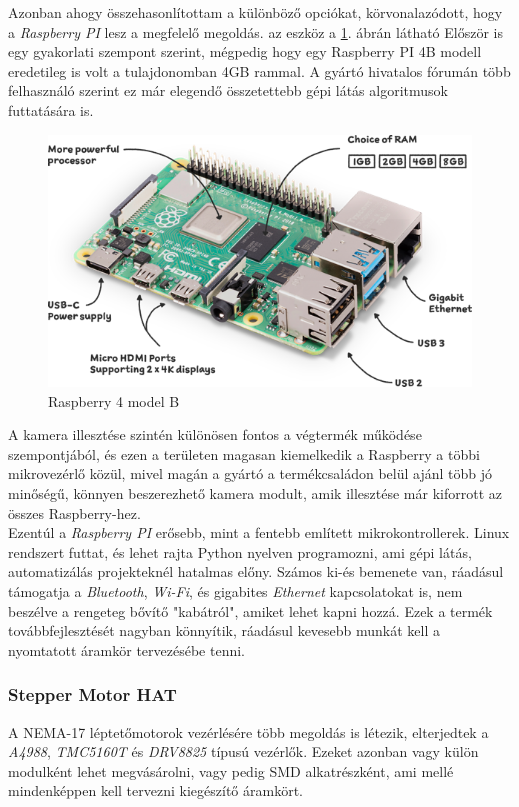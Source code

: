 \documentclass[12pt,a4paper]{article}
\begin{document}
Azonban ahogy összehasonlítottam a különböző opciókat, körvonalazódott, hogy a \textsl{Raspberry PI} lesz a megfelelő megoldás. az eszköz a \ref{fig:elek_raspberry4b}. ábrán látható Először is egy gyakorlati szempont szerint, mégpedig hogy egy Raspberry PI 4B modell eredetileg is volt a tulajdonomban 4GB rammal. A gyártó hivatalos fórumán több felhasználó szerint ez már elegendő összetettebb gépi látás algoritmusok futtatására is. \cite{4gbforum} \\

\begin{figure}[h!]
	\centering
	\includegraphics[width=1\linewidth]{elek_raspberry4b}
	\caption{Raspberry 4 model B}
	\label{fig:elek_raspberry4b}
\end{figure}

A kamera illesztése szintén különösen fontos a végtermék működése szempontjából, és ezen a területen magasan kiemelkedik a Raspberry a többi mikrovezérlő közül, mivel magán a gyártó a termékcsaládon belül ajánl több jó minőségű, könnyen beszerezhető kamera modult, amik illesztése már kiforrott az összes Raspberry-hez.\\

Ezentúl a \textsl{Raspberry PI} erősebb, mint a fentebb említett mikrokontrollerek. Linux rendszert futtat, és lehet rajta Python nyelven programozni, ami gépi látás, automatizálás projekteknél hatalmas előny. Számos ki-és bemenete van, ráadásul támogatja a \textsl{Bluetooth}, \textsl{Wi-Fi}, és gigabites \textsl{Ethernet} kapcsolatokat is, nem beszélve a rengeteg bővítő "kabátról", amiket lehet kapni hozzá. Ezek a termék továbbfejlesztését nagyban könnyítik, ráadásul kevesebb munkát kell a nyomtatott áramkör tervezésébe tenni. \cite{raspberry4}

\subsubsection*{Stepper Motor HAT}
A NEMA-17 léptetőmotorok vezérlésére több megoldás is létezik, elterjedtek a \textsl{A4988}, \textsl{TMC5160T} és \textsl{DRV8825} típusú vezérlők. Ezeket azonban vagy külön modulként lehet megvásárolni, vagy pedig SMD alkatrészként, ami mellé mindenképpen kell tervezni kiegészítő áramkört. \\
\end{document}
